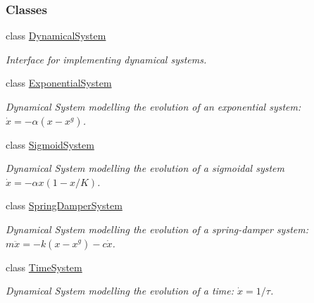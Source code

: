\subsubsection*{Classes}
\begin{DoxyCompactItemize}
\item 
class \hyperlink{classDmpBbo_1_1DynamicalSystem}{Dynamical\+System}
\begin{DoxyCompactList}\small\item\em Interface for implementing dynamical systems. \end{DoxyCompactList}\item 
class \hyperlink{classDmpBbo_1_1ExponentialSystem}{Exponential\+System}
\begin{DoxyCompactList}\small\item\em Dynamical System modelling the evolution of an exponential system\+: $\dot{x} = -\alpha (x-x^g)$. \end{DoxyCompactList}\item 
class \hyperlink{classDmpBbo_1_1SigmoidSystem}{Sigmoid\+System}
\begin{DoxyCompactList}\small\item\em Dynamical System modelling the evolution of a sigmoidal system $\dot{x} = -\alpha x(1-x/K)$. \end{DoxyCompactList}\item 
class \hyperlink{classDmpBbo_1_1SpringDamperSystem}{Spring\+Damper\+System}
\begin{DoxyCompactList}\small\item\em Dynamical System modelling the evolution of a spring-\/damper system\+: $ m\ddot{x} = -k(x-x^g) -c\dot{x}$. \end{DoxyCompactList}\item 
class \hyperlink{classDmpBbo_1_1TimeSystem}{Time\+System}
\begin{DoxyCompactList}\small\item\em Dynamical System modelling the evolution of a time\+: $\dot{x} = 1/\tau$. \end{DoxyCompactList}\end{DoxyCompactItemize}
